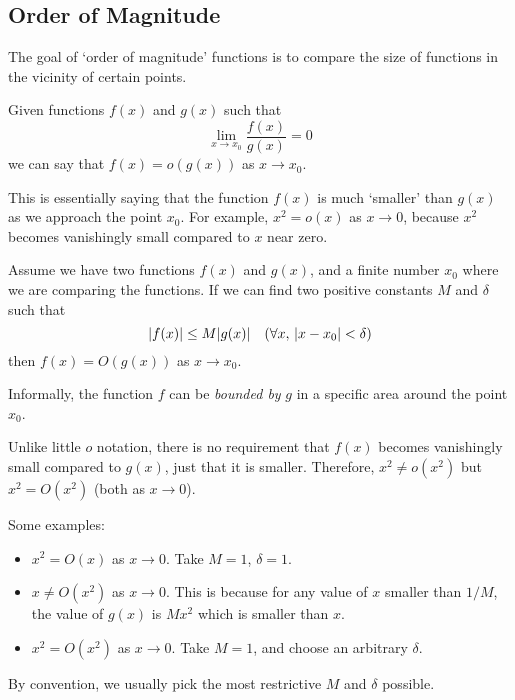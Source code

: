 \documentclass{article}
\begin{document}
	\subsection{Order of Magnitude}
	The goal of `order of magnitude' functions is to compare the size of functions in the vicinity of certain points.
	\begin{definition}[Little $o$]
		Given functions $f(x)$ and $g(x)$ such that
		\begin{equation}
			\lim\limits_{x \to x_0} \frac{f(x)}{g(x)} = 0
		\end{equation}
		we can say that $f(x) = o(g(x))$ as $x \to x_0$.
	\end{definition}

	This is essentially saying that the function $f(x)$ is much `smaller' than $g(x)$ as we approach the point $x_0$. For example, $x^2 = o(x)$ as $x \to 0$, because $x^2$ becomes vanishingly small compared to $x$ near zero.
	
	\begin{definition}
		Assume we have two functions $f(x)$ and $g(x)$, and a finite number $x_0$ where we are comparing the functions. If we can find two positive constants $M$ and $\delta$ such that
		\begin{equation}
			\abs{f(x)} \leq M\abs{g(x)} \quad(\forall x,\, \abs{x-x_0} < \delta)
		\end{equation}
		then $f(x) = O(g(x))$ as $x \to x_0$.
	\end{definition}
	Informally, the function $f$ can be \textit{bounded by} $g$ in a specific area around the point $x_0$.
	
	Unlike little $o$ notation, there is no requirement that $f(x)$ becomes vanishingly small compared to $g(x)$, just that it is smaller. Therefore, $x^2 \neq o(x^2)$ but $x^2 = O(x^2)$ (both as $x \to 0$).
	
	Some examples:
	\begin{itemize}
		\item $x^2 = O(x)$ as $x \to 0$. Take $M = 1$, $\delta = 1$.
		\item $x \neq O(x^2)$ as $x \to 0$. This is because for any value of $x$ smaller than $1/M$, the value of $g(x)$ is $Mx^2$ which is smaller than $x$.
		\item $x^2 = O(x^2)$ as $x \to 0$. Take $M = 1$, and choose an arbitrary $\delta$.
	\end{itemize}

	By convention, we usually pick the most restrictive $M$ and $\delta$ possible.
	
\end{document}
